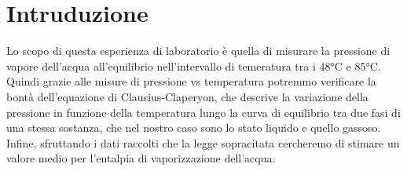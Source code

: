 \section{Intruduzione}

Lo scopo di questa esperienza di laboratorio è quella di misurare la pressione di vapore dell'acqua all'equilibrio nell'intervallo di temeratura tra i 48°C e 85°C. Quindi grazie alle misure di pressione vs temperatura potremmo verificare la bontà dell'equazione di Clausius-Claperyon, che descrive la variazione della pressione in funzione della temperatura lungo la curva di equilibrio tra due fasi di una stessa sostanza, che nel nostro caso sono lo stato liquido e quello gassoso.
Infine, sfruttando i dati raccolti che la legge sopracitata cercheremo di stimare un valore medio per l'entalpia di vaporizzazione dell'acqua.